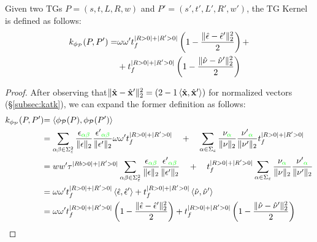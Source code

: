 \begin{proposition}\label{lem:rewritinglemma}
Given two TGs $P=(s,t,L,R,w)$ and $P'=(s',t',L',R',w')$, the TG Kernel is defined as follows:
$$\begin{aligned}
k_{\phi_{\mathcal{P}}}(P,P')=&\omega\omega't_f^{|R>0|+|R'>0|}\left(1-\frac{\|\hat{\epsilon}-\hat{\epsilon}'\|_{2}^2}{2}\right)+\\
	&+t_f^{|R>0|+|R'>0|}\left(1-\frac{\|\hat{\nu}-\hat{\nu}'\|_{2}^2}{2}\right)\\
\end{aligned}$$
\end{proposition}
\begin{proof} After observing that$\|\hat{\mathbf{x}}-\hat{\mathbf{x}}'\|_2^2=(2-1\braket{\hat{\mathbf{x}},\hat{\mathbf{x}}'})$ for normalized vectors (\S\ref{subsec:katk}), we can expand the former definition as follows:
$$\begin{aligned}
{k_{\phi_{\mathcal{P}}}(P,P')}&{=\Braket{\phi_{\mathcal{P}}(P),\phi_{\mathcal{P}}(P')}}\\
	&{=\sum_{\alpha\beta\in \Sigma_\varepsilon^2}\frac{\epsilon_{\color{green}\alpha\beta}}{\|\epsilon\|_2}\frac{{\epsilon'}_{\color{green}\alpha\beta}}{\|\epsilon'\|_2}\omega\omega't_f^{|R>0|+|R'>0|}\quad+\quad \sum_{\alpha\in \Sigma_\varepsilon}\frac{\nu_{\color{green}\alpha}}{\|\nu\|_2}\frac{{\nu'}_{\color{green}\alpha}}{\|\nu'\|_2}t_f^{|R>0|+|R'>0|}}\\
	&{=ww'\tau^{|Rb>0|+|R'>0|}\sum_{\alpha\beta\in \Sigma_\varepsilon^2}\frac{\epsilon_{\color{green}\alpha\beta}}{\|\epsilon\|_2}\frac{{\epsilon'}_{\color{green}\alpha\beta}}{\|\epsilon'\|_2}\quad+\quad t_f^{|R>0|+|R'>0|}\sum_{\alpha\in \Sigma_\varepsilon}\frac{\nu_{\color{green}\alpha}}{\|\nu\|_2}\frac{{\nu'}_{\color{green}\alpha}}{\|\nu'\|_2}}\\
	&{=\omega\omega't_f^{|R>0|+|R'>0|}\Braket{\hat{\epsilon}, \hat{\epsilon}'}+ t_f^{|R>0|+|R'>0|}\Braket{\hat{\nu}, \hat{\nu}'}}\\
	&{=\omega\omega't_f^{|R>0|+|R'>0|}\left(1-\frac{\|\hat{\epsilon}- \hat{\epsilon}'\|_{2}^2}{2}\right)+ t_f^{|R>0|+|R'>0|}\left(1-\frac{\|\hat{\nu}- \hat{\nu}'\|_{2}^2}{2}\right)}\\
\end{aligned}$$
\end{proof}

